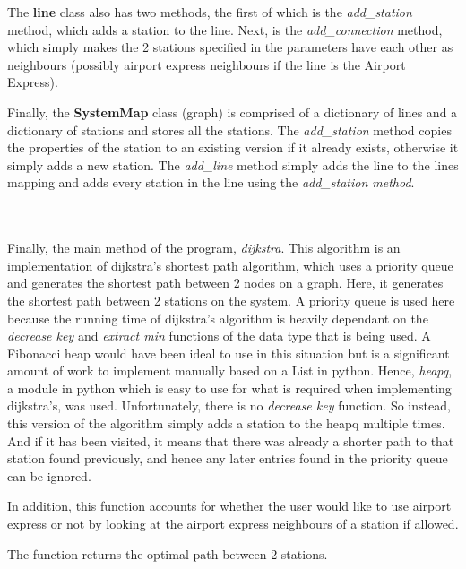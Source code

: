 \documentclass[fontsize=11pt]{article}
\begin{document}
The \textbf{line} class also has two methods, the first of which is the \textit{add\_station} method, which adds a station to the line. Next, is the \textit{add\_connection} method, which simply makes the 2 stations specified in the parameters have each other as neighbours (possibly airport express neighbours if the line is the Airport Express).

Finally, the \textbf{SystemMap} class (graph) is comprised of a dictionary of lines and a dictionary of stations and stores all the stations. The \textit{add\_station} method copies the properties of the station to an existing version if it already exists, otherwise it simply adds a new station. The \textit{add\_line} method simply adds the line to the lines mapping and adds every station in the line using the \textit{add\_station method}.

\\\\
Finally, the main method of the program, \textit{\textit{dijkstra}}. This algorithm is an implementation of dijkstra's shortest path algorithm, which uses a priority queue and generates the shortest path between 2 nodes on a graph. Here, it generates the shortest path between 2 stations on the system. A priority queue is used here because the running time of dijkstra's algorithm is heavily dependant on the \textit{decrease key} and \textit{extract min} functions of the data type that is being used. A Fibonacci heap would have been ideal to use in this situation but is a significant amount of work to implement manually based on a List in python. Hence, \textit{heapq}, a module in python which is easy to use for what is required when implementing dijkstra's, was used. Unfortunately, there is no \textit{decrease key} function. So instead, this version of the algorithm simply adds a station to the heapq multiple times. And if it has been visited, it means that there was already a shorter path to that station found previously, and hence any later entries found in the priority queue can be ignored. 

In addition, this function accounts for whether the user would like to use airport express or not by looking at the airport express neighbours of a station if allowed. 

The function returns the optimal path between 2 stations.
\end{document}
